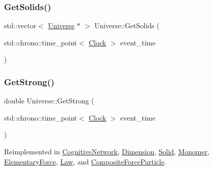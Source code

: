 \mbox{\label{classUniverse_a669fc068dd7820a5af309bfbe67199aa}} 
\subsubsection{\texorpdfstring{Get\+Solids()}{GetSolids()}}
{\footnotesize\ttfamily std\+::vector$<$ \mbox{\hyperlink{classUniverse}{Universe}} $\ast$ $>$ Universe\+::\+Get\+Solids (\begin{DoxyParamCaption}\item[{std\+::chrono\+::time\+\_\+point$<$ \mbox{\hyperlink{universe_8h_a0ef8d951d1ca5ab3cfaf7ab4c7a6fd80}{Clock}} $>$}]{event\+\_\+time }\end{DoxyParamCaption})}

\mbox{\label{classUniverse_acb453ce71da418c5b5617fecede9571b}} 
\subsubsection{\texorpdfstring{Get\+Strong()}{GetStrong()}}
{\footnotesize\ttfamily double Universe\+::\+Get\+Strong (\begin{DoxyParamCaption}\item[{std\+::chrono\+::time\+\_\+point$<$ \mbox{\hyperlink{universe_8h_a0ef8d951d1ca5ab3cfaf7ab4c7a6fd80}{Clock}} $>$}]{event\+\_\+time }\end{DoxyParamCaption})\hspace{0.3cm}{\ttfamily [virtual]}}



Reimplemented in \mbox{\hyperlink{classCognitiveNetwork_a277247686f8af159e7a7beb0ec379225}{Cognitive\+Network}}, \mbox{\hyperlink{classDimension_ae36aadad4ae84735a5ff73bff4eb97b1}{Dimension}}, \mbox{\hyperlink{classSolid_ae39d0166456b8feaa39547e5a21c9096}{Solid}}, \mbox{\hyperlink{classMonomer_aa35033340e88c46757d1d5ccba21a21e}{Monomer}}, \mbox{\hyperlink{classElementaryForce_aaa1cde27b1508831f67353eb39745a7e}{Elementary\+Force}}, \mbox{\hyperlink{classLaw_afd94bf09dbaf5d5df36b8f093db02dd9}{Law}}, and \mbox{\hyperlink{classCompositeForceParticle_a9818d469c9841eaf77fbe329b0953354}{Composite\+Force\+Particle}}.

\mbox{\label{classUniverse_ab44daccba01ee7e3cf9b50bba83dd19e}} 
